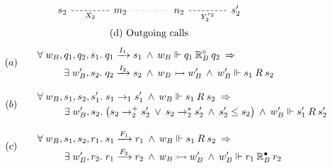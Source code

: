 \begin{figure}
\[\begin{array}{c}
\begin{tikzcd}[row sep=4.5ex, column sep=4.5ex]
        \\
        &&
        \\
        s_2 \ar[rr, "X_2"', dash, dashed] &&
        m_2 \ar[rr, dotted, dash] &&
        n_2 \ar[rr, "Y_2^{s_2}"', dash, dashed] &&
        s_2'
      \end{tikzcd}
      \vspace{1ex} \\
      \text{(d) Outgoing calls}
    \end{array}
  \]
  \vspace{1.5ex}
  \[
    \begin{array}{c@{\qquad}l}
      \vspace{2.8ex}
      (a) &
      {
        \begin{aligned}
          \forall\; w_B, q_1, q_2, s_1 .\;
          & q_1 \xrightarrow{I_1} s_1
          \:\wedge\:
          w_B \Vdash q_1 \mathbin{\mathbb{R}_B^\que} q_2 \:\Rightarrow
          \\
          \exists\; w'_B, s_2.\;
          & q_2 \xrightarrow{I_2} s_2
          \:\wedge\:
          w_B \sysstep w'_B
          \:\wedge\:
          w'_B \Vdash s_1 \mathbin{R} s_2
        \end{aligned}
      }
      \\
      \vspace{2.8ex}
      (b) &
      {
        \begin{aligned}
          \forall\; w_B, s_1, s_2, s_1' .\;
          & s_1 \rightarrow_1 s_1'
          \:\wedge\:
          w_B \Vdash s_1 \mathbin{R} s_2 \:\Rightarrow \\
          \exists\; w'_B, s_2.\;
          & \bigl(s_2 \rightarrow^+_2 s_2'
            \:\vee\:
            s_2 \rightarrow^*_2 s_2'
            \:\wedge\:
            s_2' \le s_2
          \bigr)
          \:\wedge\:
          w'_B \Vdash s_1' \mathbin{R} s_2'
        \end{aligned}
      }
      \\
      \vspace{2.8ex}
      (c) &
      {
        \begin{aligned}
          \forall\; w_B, s_1, s_2, r_1 .\;
          & s_1 \xrightarrow{F_1} r_1
          \:\wedge\:
          w_B \Vdash s_1 \mathbin{R} s_2 \:\Rightarrow \\
          \exists\; w'_B, r_2.\;
          & r_1 \xrightarrow{F_2} r_2
          \:\wedge\:
          w_B \sysstep w'_B
          \:\wedge\:
          w'_B \Vdash r_1 \mathbin{\mathbb{R}_B^\ans} r_2
        \end{aligned}
}
\end{array}\]
\end{figure}
